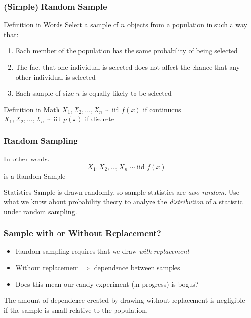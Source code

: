 \documentclass[handout]{beamer}
\begin{document}

\begin{frame}
\frametitle{(Simple) Random Sample}

\begin{block}{Definition in Words}
Select a sample of $n$ objects from a population in such a way that:
	\begin{enumerate}
\item Each member of the population has the same probability of being selected 
\item The fact that one individual is selected does not affect the chance that any other individual is selected
\item Each sample of size $n$ is equally likely to be selected

\end{enumerate}
\end{block}

\begin{alertblock}{Definition in Math}
	$X_1, X_2, \hdots, X_n \sim \mbox{iid } f(x)$ if continuous\\
  $X_1, X_2, \hdots, X_n \sim \mbox{iid } p(x)$ if discrete
\end{alertblock}

\end{frame}

\begin{frame}
\frametitle{Random Sampling}
In other words:
	$$X_1, X_2, \hdots, X_n \sim \mbox{iid } f(x)$$
is a \alert{Random Sample}

	\vspace{1em}
\begin{block}{Statistics}
Sample is drawn randomly, so sample statistics are \emph{also random}. Use what we know about probability theory to analyze the \emph{distribution} of a statistic under random sampling.
\end{block}
\end{frame}

\begin{frame}
\frametitle{Sample with or Without Replacement?}

\begin{itemize}
  \item Random sampling requires that we draw \emph{with replacement}
  \item Without replacement $\Rightarrow$ dependence between samples
  \item Does this mean our candy experiment (in progress) is bogus?
\end{itemize}

\vspace{1em}

\alert{The amount of dependence created by drawing without replacement is negligible if the sample is small relative to the population.}
\end{frame}
\end{document}
